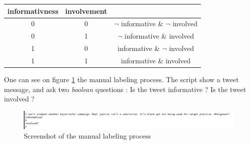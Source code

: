\documentclass[a4paper,twoside,12pt,openright]{report}
\begin{document}
\begin{center}
\begin{tabular}{ccc}
informativness & involvement & ~ \\ \hline
0 & 0 & $\neg$ informative \& $\neg$ involved \\ \hline
0 & 1 & $\neg$ informative \& involved \\ \hline
1 & 0 & informative \& $\neg$ involved \\ \hline
1 & 1 & informative \& involved \\ \hline
\end{tabular}
\end{center}

One can see on figure \ref{screenshotLabeling} the manual labeling process. The script show a tweet message, and ask two \emph{boolean} questions : Is the tweet informative ? Is the tweet involved ?

\begin{figure}[H]
\centering
\includegraphics[width=\textwidth]{images/screens/manual_label_screen.png}
\caption{Screenshot of the manual labeling process}
\label{screenshotLabeling}
\end{figure}

\newpage
\end{document}
